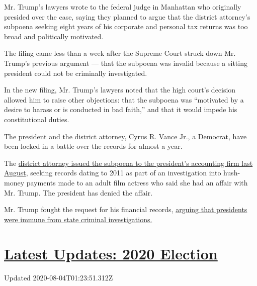 Mr. Trump's lawyers wrote to the federal judge in Manhattan who
originally presided over the case, saying they planned to argue that the
district attorney's subpoena seeking eight years of his corporate and
personal tax returns was too broad and politically motivated.

The filing came less than a week after the Supreme Court struck down Mr.
Trump's previous argument --- that the subpoena was invalid because a
sitting president could not be criminally investigated.

In the new filing, Mr. Trump's lawyers noted that the high court's
decision allowed him to raise other objections: that the subpoena was
``motivated by a desire to harass or is conducted in bad faith,'' and
that it would impede his constitutional duties.

The president and the district attorney, Cyrus R. Vance Jr., a Democrat,
have been locked in a battle over the records for almost a year.

The
\href{https://www.nytimes3xbfgragh.onion/2019/09/16/nyregion/trump-tax-returns-cy-vance.html}{district
attorney issued the subpoena to the president's accounting firm last
August}, seeking records dating to 2011 as part of an investigation into
hush-money payments made to an adult film actress who said she had an
affair with Mr. Trump. The president has denied the affair.

Mr. Trump fought the request for his financial records,
\href{https://www.nytimes3xbfgragh.onion/2019/09/19/nyregion/trump-tax-returns-lawsuit.html}{arguing
that presidents were immune from state criminal investigations.}

\hypertarget{latest-updates-2020-election}{%
\section{\texorpdfstring{\href{https://www.nytimes3xbfgragh.onion/2020/08/03/us/elections/biden-vs-trump.html?action=click\&pgtype=Article\&state=default\&region=MAIN_CONTENT_1\&context=storylines_live_updates}{Latest
Updates: 2020
Election}}{Latest Updates: 2020 Election}}\label{latest-updates-2020-election}}

Updated 2020-08-04T01:23:51.312Z

